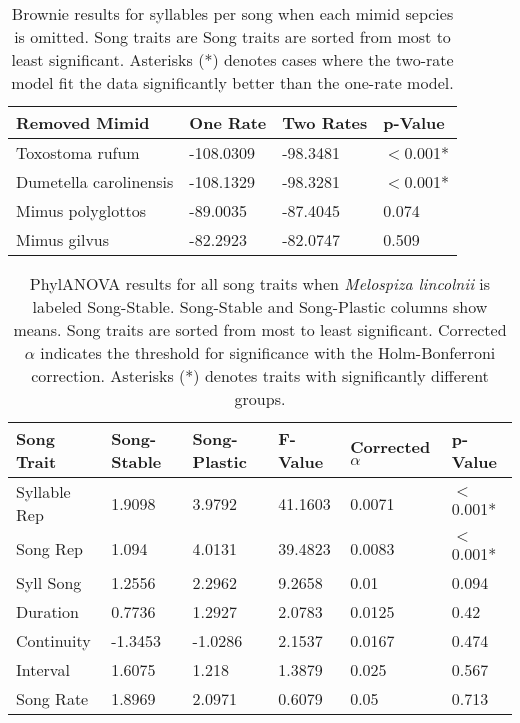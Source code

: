 \documentclass[a4paper,12pt]{article}
\begin{document}
\begin{table}[ht]
\caption{Brownie results for syllables per song when each mimid sepcies is omitted. Song traits are Song traits are sorted from most to least significant. Asterisks (*) denotes cases where the two-rate model fit the data significantly better than the one-rate model.}
\centering
\begin{tabular}{llll}
  \hline
Removed Mimid & One Rate & Two Rates & p-Value \\ 
  \hline
Toxostoma rufum & -108.0309 & -98.3481 & $<$0.001* \\ 
  Dumetella carolinensis & -108.1329 & -98.3281 & $<$0.001* \\ 
  Mimus polyglottos & -89.0035 & -87.4045 & 0.074 \\ 
  Mimus gilvus & -82.2923 & -82.0747 & 0.509 \\ 
   \hline
\end{tabular}
\end{table}


\begin{table}[ht]
\caption{PhylANOVA results for all song traits when \textit{Melospiza lincolnii} is labeled Song-Stable. Song-Stable and Song-Plastic columns show means. Song traits are sorted from most to least significant. Corrected $\alpha$ indicates the threshold for significance with the Holm-Bonferroni correction. Asterisks (*) denotes traits with significantly different groups.}
\centering
\begin{tabular}{llllll}
  \hline
Song Trait & Song-Stable & Song-Plastic & F-Value & Corrected $\alpha$ & p-Value \\ 
  \hline
Syllable Rep & 1.9098 & 3.9792 & 41.1603 & 0.0071 & $<$0.001* \\ 
  Song Rep & 1.094 & 4.0131 & 39.4823 & 0.0083 & $<$0.001* \\ 
  Syll Song & 1.2556 & 2.2962 & 9.2658 & 0.01 & 0.094 \\ 
  Duration & 0.7736 & 1.2927 & 2.0783 & 0.0125 & 0.42 \\ 
  Continuity & -1.3453 & -1.0286 & 2.1537 & 0.0167 & 0.474 \\ 
  Interval & 1.6075 & 1.218 & 1.3879 & 0.025 & 0.567 \\ 
  Song Rate & 1.8969 & 2.0971 & 0.6079 & 0.05 & 0.713 \\ 
   \hline
\end{tabular}
\end{table}
\end{document}
